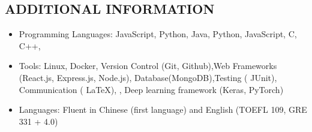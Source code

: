 \documentclass[10pt,letterpaper,palatine]{moderncv}        %
\makeatletter
\newcommand*{\customcvproject}[4][.10em]{
  \begin{tabular}{@{}l} 
    {\bfseries #2}
  \end{tabular}
  \hfill%
  \begin{tabular}{l@{}}
     {\itshape #3}
  \end{tabular}
  \ifx&#4&%
  \else{\\%
    \begin{minipage}{\maincolumnwidth}%
      \small#4%
    \end{minipage}}\fi%
  \par\addvspace{#1}}
\makeatother
\begin{document}
\begin{CJK*}{UTF8}{gbsn}

\vspace*{-4mm}
\section{ADDITIONAL INFORMATION}
\vspace*{-2mm}
    \begin{itemize}
        \item Programming Languages: JavaScript, Python, Java, Python, JavaScript, C, C++, 
        \item Tools: Linux, Docker, Version Control (Git,  Github),Web Frameworks (React.js, Express.js, Node.js), Database(MongoDB),Testing ( JUnit), Communication ( \LaTeX), ,  Deep learning framework (Keras, PyTorch)
        \item Languages: Fluent in Chinese (first language) and English (TOEFL 109, GRE 331 + 4.0)
    \end{itemize}



\end{CJK*}
\end{document}
